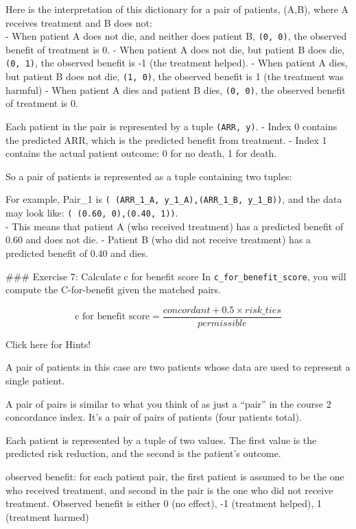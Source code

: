 \documentclass[11pt]{article}
\begin{document}
Here is the interpretation of this dictionary for a pair of patients,
(A,B), where A receives treatment and B does not:\\
- When patient A does not die, and neither does patient B,
\texttt{(0,\ 0)}, the observed benefit of treatment is 0. - When patient
A does not die, but patient B does die, \texttt{(0,\ 1)}, the observed
benefit is -1 (the treatment helped). - When patient A dies, but patient
B does not die, \texttt{(1,\ 0)}, the observed benefit is 1 (the
treatment was harmful) - When patient A dies and patient B dies,
\texttt{(0,\ 0)}, the observed benefit of treatment is 0.

Each patient in the pair is represented by a tuple \texttt{(ARR,\ y)}. -
Index 0 contains the predicted ARR, which is the predicted benefit from
treatment. - Index 1 contains the actual patient outcome: 0 for no
death, 1 for death.

So a pair of patients is represented as a tuple containing two tuples:

For example, Pair\_1 is
\texttt{(\ (ARR\_1\_A,\ y\_1\_A),(ARR\_1\_B,\ y\_1\_B))}, and the data
may look like: \texttt{(\ (0.60,\ 0),(0.40,\ 1))}.\\
- This means that patient A (who received treatment) has a predicted
benefit of 0.60 and does not die. - Patient B (who did not receive
treatment) has a predicted benefit of 0.40 and dies.

     \#\#\# Exercise 7: Calculate c for benefit score In
\texttt{c\_for\_benefit\_score}, you will compute the C-for-benefit
given the matched pairs.

\[\text{c for benefit score} = \frac{concordant + 0.5 \times risk\_ties}{permissible}\]

     Click here for Hints!

A pair of patients in this case are two patients whose data are used to
represent a single patient.

A pair of pairs is similar to what you think of as just a ``pair'' in
the course 2 concordance index. It's a pair of pairs of patients (four
patients total).

Each patient is represented by a tuple of two values. The first value is
the predicted risk reduction, and the second is the patient's outcome.

observed benefit: for each patient pair, the first patient is assumed to
be the one who received treatment, and second in the pair is the one who
did not receive treatment. Observed benefit is either 0 (no effect), -1
(treatment helped), 1 (treatment harmed)
\end{document}
